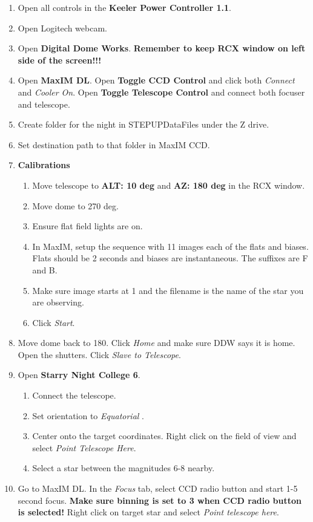 \documentclass[11pt]{report}
\begin{document}
\begin{enumerate}
\item Open all controls in the {\bf Keeler Power Controller 1.1}.
\item Open Logitech webcam. 
\item Open {\bf Digital Dome Works}. {\bf Remember to keep RCX window on left side of the screen!!!}
\item Open {\bf MaxIM DL}. Open {\bf Toggle CCD Control} and click both \emph{Connect} and \emph{Cooler On}. Open {\bf Toggle Telescope Control} and connect both focuser and telescope.
\item Create folder for the night in STEPUPDataFiles under the Z drive.
\item Set destination path to that folder in MaxIM CCD.
\item {\bf Calibrations}
\begin{enumerate}
\item Move telescope to {\bf ALT: 10 deg} and {\bf AZ: 180 deg} in the RCX window.
\item Move dome to 270 deg. 
\item Ensure flat field lights are on.
\item In MaxIM, setup the sequence with 11 images each of the flats and biases. Flats should be 2 seconds and biases are instantaneous. The suffixes are F and B. 
\item Make sure image starts at 1 and the filename is the name of the star you are observing. 
\item Click \emph{Start}.
\end{enumerate}
\item Move dome back to 180. Click \emph{Home} and make sure DDW says it is home. Open the shutters. Click \emph{Slave to Telescope}.
\item Open {\bf Starry Night College 6}. 
\begin{enumerate}
\item Connect the telescope. 
\item Set orientation to \emph{Equatorial} .
\item Center onto the target coordinates. Right click on the field of view and select \emph{Point Telescope Here}.
\item Select a star between the magnitudes 6-8 nearby. 
\end{enumerate}
\item Go to MaxIM DL. In the \emph{Focus} tab, select CCD radio button and start 1-5 second focus. {\bf Make sure binning is set to 3 when CCD radio button is selected!} Right click on target star and select \emph{Point telescope here}.

\end{enumerate}
\end{document}
